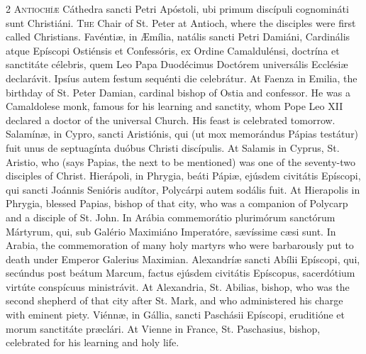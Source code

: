\begin{paracol}{2}
\lettrine[lines=2]{A}{ntiochíæ} Cáthedra sancti Petri Apóstoli, ubi 
 primum discípuli cognomináti sunt Christiáni.
\switchcolumn
{}
\lettrine[lines=2]{T}{he} Chair of St. Peter at Antioch, where the disciples were first called 
 Christians.
\switchcolumn*
{}
Favéntiæ, in Æmília, natális sancti Petri 
 Damiáni, Cardinális atque Epíscopi Ostiénsis et Confessóris, ex Ordine 
 Camaldulénsi, doctrína et sanctitáte célebris, quem Leo Papa Duodécimus 
 Doctórem universális Ecclésiæ declarávit. Ipsíus autem festum sequénti 
 die celebrátur.
\switchcolumn
{}
At Faenza in Emilia, the birthday of St. Peter Damian, cardinal bishop of 
 Ostia and confessor. He was a Camaldolese monk, famous for his 
 learning and sanctity, whom Pope Leo XII declared a doctor of the universal 
 Church. His feast is celebrated tomorrow.
\switchcolumn*
{}
Salamínæ, in Cypro, sancti Aristiónis, qui (ut 
 mox memorándus Pápias testátur) fuit unus de septuagínta duóbus Christi 
 discípulis.
\switchcolumn
{}
At Salamis in Cyprus, St. Aristio, who (says Papias, the next to be 
 mentioned) was one of the seventy-two disciples of Christ.
\switchcolumn*
{}
Hierápoli, in Phrygia, beáti Pápiæ, ejúsdem 
 civitátis Epíscopi, qui sancti Joánnis Senióris audítor, Polycárpi autem 
 sodális fuit.
\switchcolumn
{}
At Hierapolis in Phrygia, blessed Papias, bishop of that city, who was a 
 companion of Polycarp and a disciple of St. John.
\switchcolumn*
{}
In Arábia commemorátio plurimórum sanctórum Mártyrum, qui, sub Galério 
 Maximiáno Imperatóre, sævíssime cæsi sunt.
\switchcolumn
{}
In Arabia, the commemoration of many holy martyrs who were barbarously put 
 to death under Emperor Galerius Maximian.
\switchcolumn*
{}
Alexandríæ sancti Abílii Epíscopi, qui, 
 secúndus post beátum Marcum, factus ejúsdem civitátis Epíscopus, sacerdótium 
 virtúte conspícuus ministrávit.
\switchcolumn
{}
At Alexandria, St. Abilias, bishop, who was the second shepherd of that city 
 after St. Mark, and who administered his charge with eminent piety.
\switchcolumn*
{}
Viénnæ, in Gállia, sancti Paschásii Epíscopi, 
 eruditióne et morum sanctitáte præclári.
\switchcolumn
{}
At Vienne in France, St. Paschasius, bishop, celebrated for his learning and 
 holy life.
\switchcolumn*

\end{paracol}
